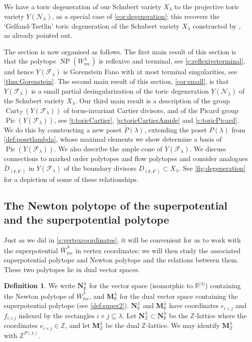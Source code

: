 \documentclass{amsart}
\theoremstyle{definition}
\newtheorem{defn}[thm]{Definition}
\numberwithin{equation}{section}
\newcommand{\Pic}{\operatorname{Pic}}
\newcommand{\R}{\mathbb R}
\newcommand{\FF}{\mathcal{F}}
\newcommand{\CC}{\mathcal{N}}
\newcommand{\rect}{\mathrm{rec}}
\newcommand{\NP}{\operatorname{NP}}
\newcommand{\rW}{\overline{W}}
\newcommand{\Z}{\mathbb{Z}}
\begin{document}
We 
have a toric degeneration of our Schubert variety $X_\lambda$ to the projective toric variety $Y(\CC_\lambda)$, as a special case of \cref{cor:degeneration};
this recovers the `Gelfand-Tsetlin' toric degeneration of the Schubert variety $X_\lambda$ constructed by \cite{GL}, as already pointed out. 


The section is now organised as follows. The first main result of this section is 
that the polytope $\NP(W^\lambda_{\rect})$ is reflexive and terminal, see \cref{c:reflexiveterminal},
and hence $Y(\FF_\lambda)$ is Gorenstein Fano with at most terminal singularities, 
see \cref{thm:Gorenstein}.
The second main result of this section, \cref{cor:small}, is that 
$Y(\FF_\lambda)$ is a small partial desingularization of the toric 
degeneration $Y(\CC_\lambda)$ of the Schubert variety 
$X_{\lambda}$. 
Our third main result is a description of the group $\operatorname{Cart}_T(Y(\FF_\lambda))$ of torus-invariant Cartier divisors, 
and of the Picard group $\Pic(Y(\FF_\lambda))$, see  
	\cref{t:toricCartier}, \cref{p:toricCartierAmple} and \cref{c:toricPicard}. We do this by constructing a new poset $\widetilde{P}(\lambda)$, 
extending the poset $P(\lambda)$ from \cref{def:posetlambda}, whose maximal elements we show determine a basis of $\Pic(Y(\FF_\lambda))$. We also describe the ample cone of $Y(\FF_\lambda)$.   
We discuss connections to marked order polytopes and flow polytopes and consider analogues $\widetilde D_{(\mathbf r,\mathbf r')}$ in $Y(\FF_\lambda)$ of the boundary divisors $D_{(\mathbf r,\mathbf r')}\subset X_\lambda$. 
See \cref{fig:degeneration} for a depiction of some of these relationships.
 



\subsection{The Newton polytope of the superpotential and the superpotential
polytope}\label{sec:reflexive}

Just as we did in \cref{s:vertexcoordinates}, it will be convenient for us to 
 work with the superpotential
$\rW_{\rect}^{\lambda}$ in vertex coordinates; we will then 
study the associated superpotential polytope and Newton polytope and 
the relations between them.
These two  polytopes lie in dual vector spaces. 


\begin{defn}\label{def:Mlambda}
We write 
	$ \mathbf N^\lambda_{\R}$ 
	for the  vector space (isomorphic to $\R^{|\lambda|}$) 
containing the Newton polytope of $\rW_{\rect}^{\lambda}$, and 
  $\mathbf M^\lambda_{\R}$ 
	for the dual vector space
containing the superpotential polytope (see \cref{def:super2}).
	$ \mathbf N^\lambda_{\R}$ and 
  $\mathbf M^\lambda_{\R}$  have
	coordinates $e_{i \times j}$ and 
$ f_{i \times j}$ indexed by 
the rectangles $i \times j \subseteq \lambda$. 
Let $\mathbf N^\lambda_\Z\subset \mathbf N^\lambda_{\R}$ be the $\Z$-lattice where the coordinates $e_{i\times j}\in\Z$, and 
	let $\mathbf M^\lambda_\Z$ be the dual $\Z$-lattice. 
	We may identify $\mathbf M^\lambda_\Z$ with $\Z^{P(\lambda)}$. 
\end{defn}
\end{document}
